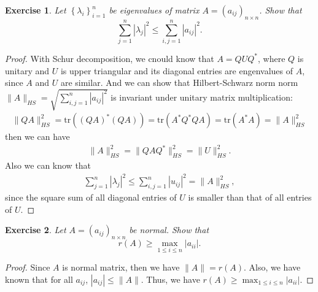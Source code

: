 \documentclass[11pt]{book}
\newtheorem{exercise}{Exercise}[section]
\theoremstyle{definition}
\numberwithin{equation}{chapter}
\begin{document}
\medskip

\begin{exercise}
Let $\left\{  \lambda_{i}\right\}  _{i=1}^{n}$ be eigenvalues of matrix
$A=\left(  a_{ij}\right)  _{n\times n}$. Show that%
$$
\sum_{j=1}^{n}\left\vert \lambda_{j}\right\vert ^{2}\leq\sum_{i,j=1}%
^{n}\left\vert a_{ij}\right\vert ^{2}.
$$
\end{exercise}
\begin{proof}
With Schur decomposition, we cnould know that $A = Q U Q^*$, where $Q$ is unitary and $U$ is upper triangular and its diagonal entries are engenvalues of $A$, since $A$ and $U$ are similar. And we can show that Hilbert-Schwarz norm norm $\|A\|_{HS} = \sqrt{\sum_{i,j=1}^{n} \left|a_{ij}\right|^2}$ is invariant under unitary matrix multiplication:
\begin{align*}
    \|QA\|_{HS}^2 = \text{tr} \left((QA)^* (QA)\right) = \text{tr} \left(A^* Q^* QA\right) = \text{tr} \left(A^* A\right) = \|A\|_{HS}^2
\end{align*}
then we can have 
\begin{align*}
    \|A\|_{HS}^2 = \|QAQ^*\|_{HS}^2 = \|U\|_{HS}^2.
\end{align*}
Also we can know that
\begin{align*}
    \sum_{j=1}^{n}\left| \lambda_{j}\right|^{2}\leq \sum_{i,j=1}^{n}\left| u_{ij}\right|^{2} = \|A\|_{HS}^2,
\end{align*}
since the square sum of all diagonal entries of $U$ is smaller than that of all entries of $U$.
\end{proof}

\medskip

\begin{exercise}
Let $A=\left(  a_{ij}\right)  _{n\times n}$ be normal. Show that%
$$
r\left(  A\right)  \geq\max_{1\leq i\leq n}\left\vert a_{ii}\right\vert .
$$
\end{exercise}
\begin{proof}
Since $A$ is normal matrix, then we have $\|A\| = r(A)$. Also, we have known that for all $a_{ij}$, $\left|a_{ij}\right|\leq \|A\|$. Thus, we have $r(A)\geq \max_{1\leq i\leq n}\left|a_{ii}\right|$.
\end{proof}

\medskip
\end{document}
